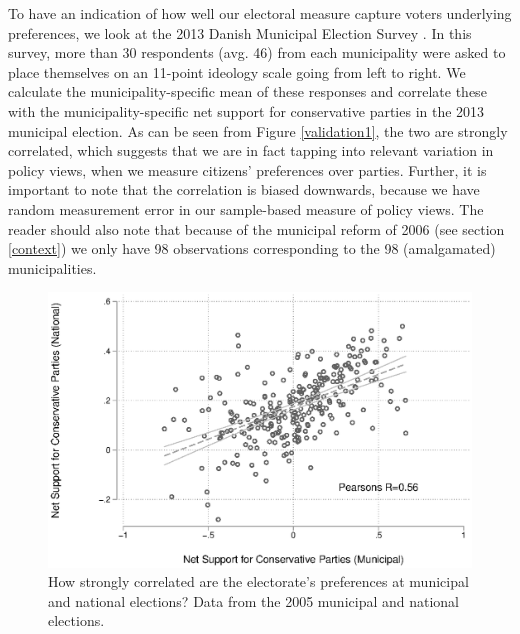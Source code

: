 \documentclass[a4paper,12pt]{article}
\begin{document}
To have an indication of how well our electoral measure capture voters underlying preferences, we look at the 2013 Danish Municipal Election Survey \cite{elklit2017kv13}. In this survey, more than 30 respondents (avg. 46) from each municipality were asked to place themselves on an 11-point ideology scale going from left to right. We calculate the municipality-specific mean of these responses and correlate these with the municipality-specific net support for conservative parties in the 2013 municipal election.  As can be seen from Figure \ref{validation1}, the two are strongly correlated, which suggests that we are in fact tapping into relevant variation in policy views, when we measure citizens' preferences over parties. Further, it is important to note that the correlation is biased downwards, because we have random measurement error in our sample-based measure of policy views. The reader should also note that because of the municipal reform of 2006 (see section \ref{context})  we only have 98 observations corresponding to the 98 (amalgamated) municipalities.


\begin{figure}[htbp]
	
	\includegraphics[width=1\textwidth]{validation2.eps}
	\caption{How strongly correlated are the electorate's preferences at municipal and national elections? Data from the 2005 municipal and national elections.} \label{validation2}
	
\end{figure}
\end{document}

